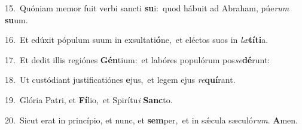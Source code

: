 {\numbfont\textcolor{\numbcolor}{15.}}~Quóniam memor fuit verbi sancti \textbf{su}\-i:~\star quod hábuit ad Abraham, púe\textit{rum} \textbf{su}\-um.\par
{\numbfont\textcolor{\numbcolor}{16.}}~Et edúxit pópulum suum in exsultati\-\textbf{ó}\-ne,~\star et eléctos suos in \textit{læ}\-\textbf{tí}\textbf{ti}a.\par
{\numbfont\textcolor{\numbcolor}{17.}}~Et dedit illis regiónes \textbf{Gén}\-tium:~\star et labóres populórum pos\-\textit{se}\-\textbf{dé}runt:\par
{\numbfont\textcolor{\numbcolor}{18.}}~Ut custódiant justificatiónes \textbf{e}\-jus,~\star et legem ejus \textit{re}\-\textbf{quí}rant.\par
{\numbfont\textcolor{\numbcolor}{19.}}~Glória Patri, et \textbf{Fí}\-lio,~\star et Spirítu\textit{i} \textbf{Sanc}\-to.\par
{\numbfont\textcolor{\numbcolor}{20.}}~Sicut erat in princípio, et nunc, et \textbf{sem}\-per,~\star et in sǽcula sæculó\-\textit{rum}\-. \textbf{A}\-men.\par
